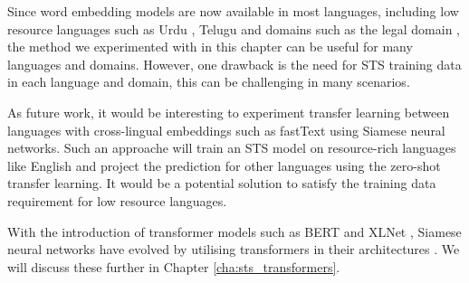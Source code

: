 Since word embedding models are now available in most languages, including low resource languages such as Urdu \autocite{haider-2018-urdu}, Telugu \autocite{kumar-etal-2020-passage} and domains such as the legal domain \autocite{Chalkidis2019}, the method we experimented with in this chapter can be useful for many languages and domains. However, one drawback is the need for STS training data in each language and domain, this can be challenging in many scenarios. 

As future work, it would be interesting to experiment transfer learning between languages with cross-lingual embeddings such as fastText \autocite{mikolov-etal-2018-advances} using Siamese neural networks. Such an approache will train an STS model on resource-rich languages like English and project the prediction for other languages using the zero-shot transfer learning. It would be a potential solution to satisfy the training data requirement for low resource languages. 

With the introduction of transformer models such as BERT \autocite{devlin-etal-2019-bert} and XLNet \autocite{yang2019xlnet}, Siamese neural networks have evolved by utilising transformers in their architectures \autocite{reimers-gurevych-2019-sentence}. We will discuss these further in Chapter \ref{cha:sts_transformers}. 












